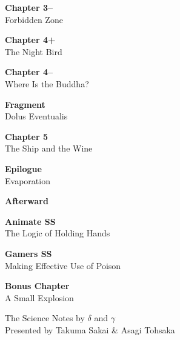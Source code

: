 \documentclass[
    a4paper,
    12pt,
    twoside,
    openany,
    UTF8,
    fontset=windows
]{ctexbook}
\begin{document}
\begin{minipage}{0.88\textwidth}
\begin{flushleft}
\begin{list}{}
        \item \textbf{Chapter 3--} \dotfill \pageref{sec:ch3m} \\[-0.1ex]
        Forbidden Zone
        
        \item \textbf{Chapter 4+} \dotfill \pageref{sec:ch4p} \\[-0.1ex]
        The Night Bird
        
        \item \textbf{Chapter 4--} \dotfill \pageref{sec:ch4m} \\[-0.1ex]
        Where Is the Buddha?
        
        \item \textbf{Fragment} \dotfill \pageref{sec:fragDolus} \\[-0.1ex]
        Dolus Eventualis
        
        \item \textbf{Chapter 5} \dotfill \pageref{sec:ch5V2} \\[-0.1ex]
        The Ship and the Wine
        
        \item \textbf{Epilogue} \dotfill \pageref{sec:epilogueV2} \\[-0.1ex]
        Evaporation
        
        \item \textbf{Afterward} \dotfill \pageref{sec:afterwordV2} \\[-0.1ex]
        
        \item \textbf{Animate SS}\dotfill \pageref{sec:a}\\[-0.1ex]
        The Logic of Holding Hands

        \item \textbf{Gamers SS}\dotfill \pageref{sec:g}\\[-0.1ex]
        Making Effective Use of Poison
        
        \item \textbf{Bonus Chapter}\dotfill \pageref{sec:b}\\[-0.1ex]
        A Small Explosion
       
    \end{list}
    \end{flushleft}
    
    \vspace{0.4cm}
    
    \begin{flushleft}
    \footnotesize\color{gray}
    The Science Notes by $\delta$ and $\gamma$ \\[-0.1ex]
    Presented by Takuma Sakai \& Asagi Tohsaka
    \end{flushleft}
\end{minipage}
\hspace*{\fill}
\end{document}
